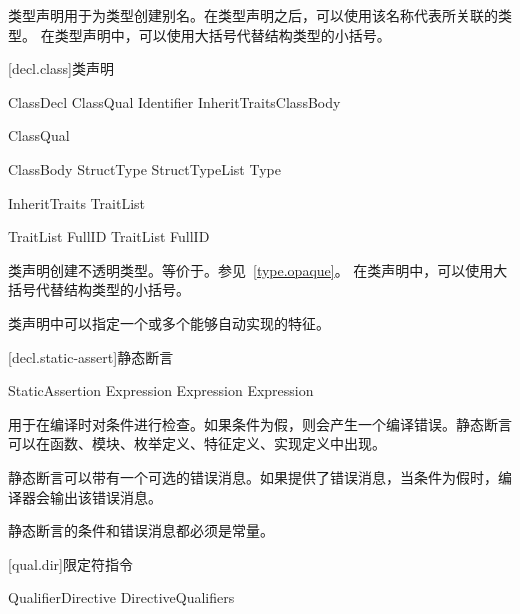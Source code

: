 \pnum
类型声明用于为类型创建别名。在类型声明之后，可以使用该名称代表所关联的类型。
在类型声明中，可以使用大括号代替结构类型的小括号。

[decl.class]{类声明}

\begin{bnf}{ClassDecl}
    ClassQual\bnfs {} Identifier InheritTraits\bnfq ClassBody
\end{bnf}

\begin{bnf}{ClassQual}
\end{bnf}

\begin{bnf}{ClassBody}
    StructType \br
    \terminal{\{} \terminal{\}} \br
    \terminal{\{} StructTypeList \terminal{,}\bnfq \terminal{\}} \br
    \terminal{=} Type
\end{bnf}

\begin{bnf}{InheritTraits}
    \terminal{:} TraitList
\end{bnf}

\begin{bnf}{TraitList}
    FullID \br
    TraitList \terminal{,} FullID
\end{bnf}

\pnum
类声明创建不透明类型。等价于。参见~\ref{type.opaque}。
在类声明中，可以使用大括号代替结构类型的小括号。

\pnum
类声明中可以指定一个或多个能够自动实现的特征。

[decl.static-assert]{静态断言}

\begin{bnf}{StaticAssertion}
      Expression \terminal{;} \br
      Expression \terminal{:} Expression \terminal{;}
\end{bnf}

\pnum
{}用于在编译时对条件进行检查。如果条件为假，则会产生一个编译错误。静态断言可以在函数、模块、枚举定义、特征定义、实现定义中出现。

\pnum
静态断言可以带有一个可选的错误消息。如果提供了错误消息，当条件为假时，编译器会输出该错误消息。

\pnum
静态断言的条件和错误消息都必须是常量。

[qual.dir]{限定符指令}

\begin{bnf}{QualifierDirective}
    DirectiveQualifiers \terminal{::}
\end{bnf}


